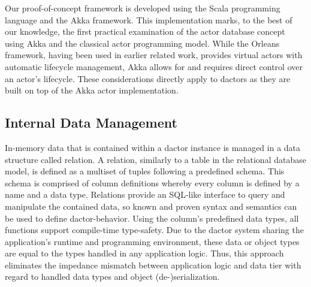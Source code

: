 Our proof-of-concept framework is developed using the Scala programming language and the Akka framework.
This implementation marks, to the best of our knowledge, the first practical examination of the actor database concept using Akka and the classical actor programming model.
While the Orleans framework, having been used in earlier related work, provides virtual actors with automatic lifecycle management, Akka allows for and requires direct control over an actor's lifecycle.
These considerations directly apply to \glspl{dactor} as they are built on top of the Akka actor implementation.

\subsection{Internal Data Management}

In-memory data that is contained within a \gls{dactor} instance is managed in a data structure called relation.
A relation, similarly to a table in the relational database model, is defined as a multiset of tuples following a predefined schema.
This schema is comprised of column definitions whereby every column is defined by a name and a data type.
Relations provide an SQL-like interface to query and manipulate the contained data, so known and proven syntax and semantics can be used to define \gls{dactor}-behavior.
Using the column's predefined data types, all functions support compile-time type-safety.
Due to the \gls{dactor} system sharing the application's runtime and programming environment, these data or object types are equal to the types handled in any application logic.
Thus, this approach eliminates the impedance mismatch between application logic and data tier with regard to handled data types and object (de-)serialization.

